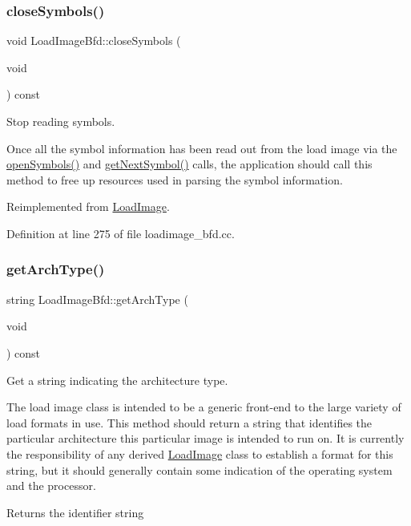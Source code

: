 \subsubsection{\texorpdfstring{closeSymbols()}{closeSymbols()}}
{\footnotesize\ttfamily void Load\+Image\+Bfd\+::close\+Symbols (\begin{DoxyParamCaption}\item[{void}]{ }\end{DoxyParamCaption}) const\hspace{0.3cm}{\ttfamily [virtual]}}



Stop reading symbols. 

Once all the symbol information has been read out from the load image via the \mbox{\hyperlink{class_load_image_a5b17f1d68413ab802966bdc7aa07cc73}{open\+Symbols()}} and \mbox{\hyperlink{class_load_image_bfd_a8db5bae4688dfea449ed8c5e9d584904}{get\+Next\+Symbol()}} calls, the application should call this method to free up resources used in parsing the symbol information. 

Reimplemented from \mbox{\hyperlink{class_load_image_a58c86c5342b7500e317ba98bcbf66753}{Load\+Image}}.



Definition at line 275 of file loadimage\+\_\+bfd.\+cc.

\mbox{\label{class_load_image_bfd_a20f8ec53008fada4bd5c8e4d2d712ca9}} 
\subsubsection{\texorpdfstring{getArchType()}{getArchType()}}
{\footnotesize\ttfamily string Load\+Image\+Bfd\+::get\+Arch\+Type (\begin{DoxyParamCaption}\item[{void}]{ }\end{DoxyParamCaption}) const\hspace{0.3cm}{\ttfamily [virtual]}}



Get a string indicating the architecture type. 

The load image class is intended to be a generic front-\/end to the large variety of load formats in use. This method should return a string that identifies the particular architecture this particular image is intended to run on. It is currently the responsibility of any derived \mbox{\hyperlink{class_load_image}{Load\+Image}} class to establish a format for this string, but it should generally contain some indication of the operating system and the processor. \begin{DoxyReturn}{Returns}
the identifier string 
\end{DoxyReturn}


